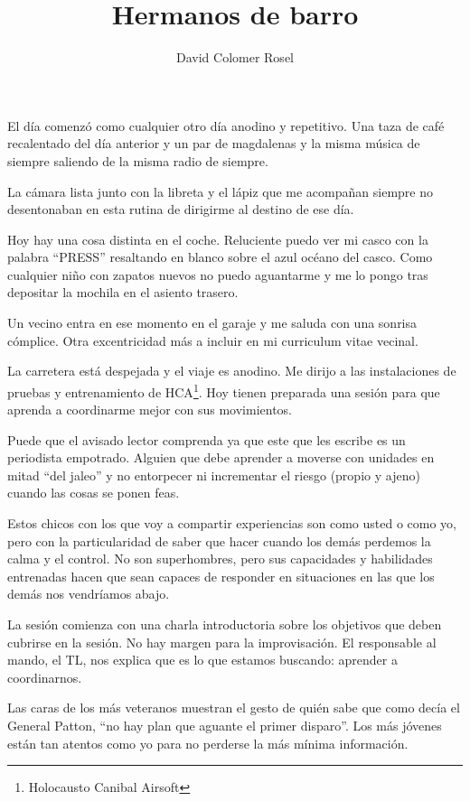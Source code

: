 \documentclass[12pt,a4paper,twoside,twocolumn,final]{article}
\author{David Colomer Rosel}
\title{Hermanos de barro}
\begin{document}
	\maketitle
	
	El d\'ia comenz\'o como cualquier otro d\'ia anodino y repetitivo. Una taza de caf\'e recalentado del d\'ia anterior y un par de magdalenas y la misma m\'usica de siempre saliendo de la misma radio de siempre.
	
	La c\'amara lista junto con la libreta y el l\'apiz que me acompa\~{n}an siempre no desentonaban en esta rutina de dirigirme al destino de ese d\'ia. 
	
	Hoy hay una cosa distinta en el coche. Reluciente puedo ver mi casco con la palabra ``PRESS'' resaltando en blanco sobre el azul oc\'eano del casco. Como cualquier ni\~{n}o con zapatos nuevos no puedo aguantarme y me lo pongo tras depositar la mochila en el asiento trasero. 
	
	Un vecino entra en ese momento en el garaje y me saluda con una sonrisa c\'omplice. Otra excentricidad m\'as a incluir en mi curriculum vitae vecinal.
	
	La carretera est\'a despejada y el viaje es anodino. Me dirijo a las instalaciones de pruebas y entrenamiento de HCA\footnote{Holocausto Canibal Airsoft}. Hoy tienen preparada una sesi\'on para que aprenda a coordinarme mejor con sus movimientos.
	
	
	
	Puede que el avisado lector comprenda ya que este que les escribe es un periodista empotrado. Alguien que debe aprender a moverse con unidades en mitad ``del jaleo'' y no entorpecer ni incrementar el riesgo (propio y ajeno) cuando las cosas se ponen feas.
	
	
	
	Estos chicos con los que voy a compartir experiencias son como usted o como yo, pero con la particularidad de saber que hacer cuando los dem\'as perdemos la calma y el control. No son superhombres, pero sus capacidades y habilidades entrenadas hacen que sean capaces de responder en situaciones en las que los dem\'as nos vendr\'iamos abajo.
	
	La sesi\'on comienza con una charla introductoria sobre los objetivos que deben cubrirse en la sesi\'on. No hay margen para la improvisaci\'on. El responsable al mando, el TL, nos explica que es lo que estamos buscando: aprender a coordinarnos.
	
	Las caras de los m\'as veteranos muestran el gesto de qui\'en sabe que como dec\'ia el General Patton, ``no hay plan que aguante el primer disparo''. Los m\'as j\'ovenes est\'an tan atentos como yo para no perderse la m\'as m\'inima informaci\'on.
	
\end{document}
